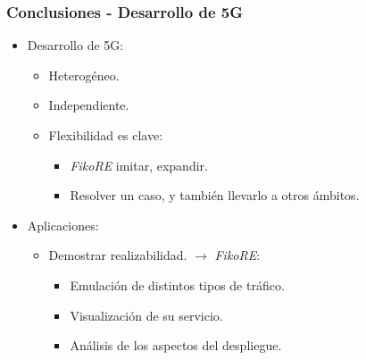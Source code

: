 \documentclass{beamer}
\begin{document}
\begin{frame}
\frametitle{Conclusiones - Desarrollo de 5G}

\begin{itemize}
\item {
	Desarrollo de 5G:
	\begin{itemize}
	\item Heterogéneo.
	\item Independiente.
	\item {
		Flexibilidad es clave:
		\begin{itemize}
		\item \textit{FikoRE} imitar, expandir.
		\item Resolver un caso, y también llevarlo a otros ámbitos.
		\end{itemize}
	}
	\end{itemize}
}
\item {
	Aplicaciones:
	\begin{itemize}
	\item {
		Demostrar realizabilidad. $\rightarrow$ \textit{FikoRE}:
		\begin{itemize}
		\item Emulación de distintos tipos de tráfico.
		\item Visualización de su servicio.
		\item Análisis de los aspectos del despliegue.
		\end{itemize}
	}
	\end{itemize}
}
\end{itemize}
\end{frame}
\end{document}
